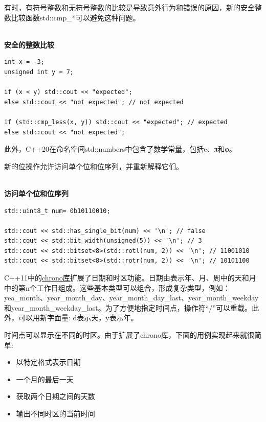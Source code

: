 
有时，有符号整数和无符号整数的比较是导致意外行为和错误的原因，新的安全整数比较函数std::cmp\_*可以避免这种问题。

\hspace*{\fill} \\ %
\noindent
\textbf{安全的整数比较}
\begin{lstlisting}[style=styleCXX]
int x = -3;
unsigned int y = 7;

if (x < y) std::cout << "expected";
else std::cout << "not expected"; // not expected

if (std::cmp_less(x, y)) std::cout << "expected"; // expected
else std::cout << "not expected";
\end{lstlisting}

此外，C++20在命名空间std::numbers中包含了数学常量，包括e、π和φ。

新的位操作允许访问单个位和位序列，并重新解释它们。

\hspace*{\fill} \\ %
\noindent
\textbf{访问单个位和位序列}
\begin{lstlisting}[style=styleCXX]
std::uint8_t num= 0b10110010;

std::cout << std::has_single_bit(num) << '\n'; // false
std::cout << std::bit_width(unsigned(5)) << '\n'; // 3
std::cout << std::bitset<8>(std::rotl(num, 2)) << '\n'; // 11001010
std::cout << std::bitset<8>(std::rotr(num, 2)) << '\n'; // 10101100
\end{lstlisting}


C++11中的\href{https://en.cppreference.com/w/cpp/chrono}{chrono库}扩展了日期和时区功能。日期由表示年、月、周中的天和月中的第n个工作日组成。这些基本类型可以组合，形成复杂类型，例如：yea\_month、year\_month\_day、year\_month\_day\_last、year\_month\_weekday和year\_month\_weekday\_last。为了方便地指定时间点，操作符“/”可以重载。此外，可以用新字面量: d表示天，y表示年。

时间点可以显示在不同的时区。由于扩展了chrono库，下面的用例实现起来就很简单:

\begin{itemize}
\item 
以特定格式表示日期

\item 
一个月的最后一天

\item 
获取两个日期之间的天数

\item 
输出不同时区的当前时间
\end{itemize}

